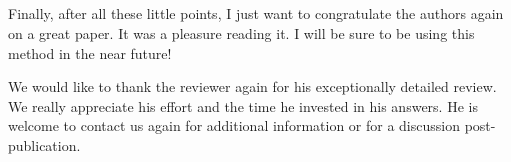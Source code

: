 \documentclass[12pt,a4paper]{article}
\newcommand{\1}{\b{1}}              %
\newcommand{\0}{\b{0}}              %
\begin{document}
\subsection{}

\begin{mdframed}[style=comment]

Finally, after all these little points, I just want to congratulate the authors again on a great paper. It was a pleasure reading it. I will be sure to be using this method in the near future!
\end{mdframed}

We would like to thank the reviewer again for his exceptionally detailed review.
We really appreciate his effort and the time he invested in his answers.
He is welcome to contact us again for additional information or for a discussion post-publication.


\clearpage
\newpage



\end{document}
